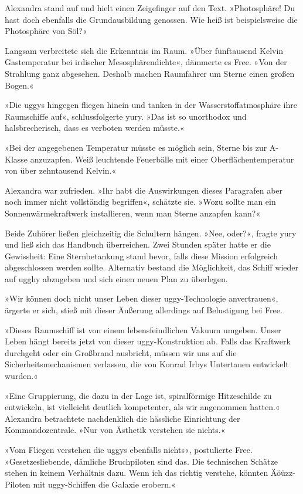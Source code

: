 Alexandra stand auf und hielt einen Zeigefinger auf den Text. »Photosphäre! Du hast doch ebenfalls die Grundausbildung genossen. Wie heiß ist beispielsweise die Photosphäre von Söl?«

Langsam verbreitete sich die Erkenntnis im Raum. »Über fünftausend Kelvin Gastemperatur bei irdischer Mesosphärendichte«, dämmerte es Free. »Von der Strahlung ganz abgesehen. Deshalb machen Raumfahrer um Sterne einen großen Bogen.«

»Die uggys hingegen fliegen hinein und tanken in der Wasserstoffatmosphäre ihre Raumschiffe auf«, schlussfolgerte yury. »Das ist so unorthodox und halsbrecherisch, dass es verboten werden müsste.«

»Bei der angegebenen Temperatur müsste es möglich sein, Sterne bis zur A-Klasse anzuzapfen. Weiß leuchtende Feuerbälle mit einer Oberflächentemperatur von über zehntausend Kelvin.«

Alexandra war zufrieden. »Ihr habt die Auswirkungen dieses Paragrafen aber noch immer nicht vollständig begriffen«, schätzte sie. »Wozu sollte man ein Sonnenwärmekraftwerk installieren, wenn man Sterne anzapfen kann?«

Beide Zuhörer ließen gleichzeitig die Schultern hängen. »Nee, oder?«, fragte yury und ließ sich das Handbuch überreichen. Zwei Stunden später hatte er die Gewissheit: Eine Sternbetankung stand bevor, falls diese Mission erfolgreich abgeschlossen werden sollte. Alternativ bestand die Möglichkeit, das Schiff wieder auf ugghy abzugeben und sich einen neuen Plan zu überlegen.

»Wir können doch nicht unser Leben dieser uggy-Technologie anvertrauen«, ärgerte er sich, stieß mit dieser Äußerung allerdings auf Belustigung bei Free.

»Dieses Raumschiff ist von einem lebensfeindlichen Vakuum umgeben. Unser Leben hängt bereits jetzt von dieser uggy-Konstruktion ab. Falls das Kraftwerk durchgeht oder ein Großbrand ausbricht, müssen wir uns auf die Sicherheitsmechanismen verlassen, die von Konrad Irbys Untertanen entwickelt wurden.«

»Eine Gruppierung, die dazu in der Lage ist, spiralförmige Hitzeschilde zu entwickeln, ist vielleicht deutlich kompetenter, als wir angenommen hatten.« Alexandra betrachtete nachdenklich die hässliche Einrichtung der Kommandozentrale. »Nur von Ästhetik verstehen sie nichts.«

»Vom Fliegen verstehen die uggys ebenfalls nichts«, postulierte Free. »Gesetzesliebende, dämliche Bruchpiloten sind das. Die technischen Schätze stehen in keinem Verhältnis dazu. Wenn ich das richtig verstehe, könnten Äöüzz-Piloten mit uggy-Schiffen die Galaxie erobern.«

